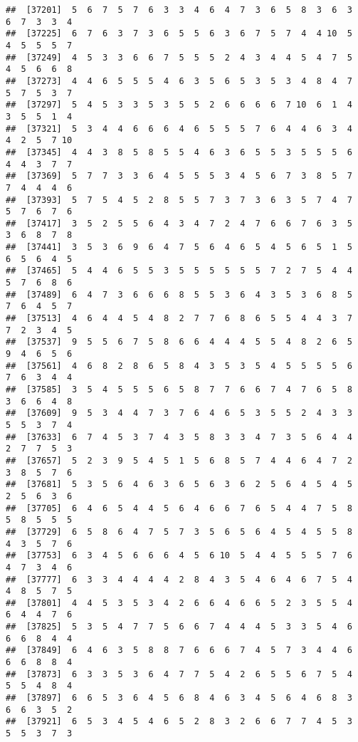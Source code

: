 \documentclass[
]{book}
\begin{document}
\begin{verbatim}
##  [37201]  5  6  7  5  7  6  3  3  4  6  4  7  3  6  5  8  3  6  3  6  7  3  3  4
##  [37225]  6  7  6  3  7  3  6  5  5  6  3  6  7  5  7  4  4 10  5  4  5  5  5  7
##  [37249]  4  5  3  3  6  6  7  5  5  5  2  4  3  4  4  5  4  7  5  4  5  6  6  8
##  [37273]  4  4  6  5  5  5  4  6  3  5  6  5  3  5  3  4  8  4  7  5  7  5  3  7
##  [37297]  5  4  5  3  3  5  3  5  5  2  6  6  6  6  7 10  6  1  4  3  5  5  1  4
##  [37321]  5  3  4  4  6  6  6  4  6  5  5  5  7  6  4  4  6  3  4  4  2  5  7 10
##  [37345]  4  4  3  8  5  8  5  5  4  6  3  6  5  5  3  5  5  5  6  4  4  3  7  7
##  [37369]  5  7  7  3  3  6  4  5  5  5  3  4  5  6  7  3  8  5  7  7  4  4  4  6
##  [37393]  5  7  5  4  5  2  8  5  5  7  3  7  3  6  3  5  7  4  7  5  7  6  7  6
##  [37417]  3  5  2  5  5  6  4  3  4  7  2  4  7  6  6  7  6  3  5  3  6  8  7  8
##  [37441]  3  5  3  6  9  6  4  7  5  6  4  6  5  4  5  6  5  1  5  6  5  6  4  5
##  [37465]  5  4  4  6  5  5  3  5  5  5  5  5  5  7  2  7  5  4  4  5  7  6  8  6
##  [37489]  6  4  7  3  6  6  6  8  5  5  3  6  4  3  5  3  6  8  5  7  6  4  5  7
##  [37513]  4  6  4  4  5  4  8  2  7  7  6  8  6  5  5  4  4  3  7  7  2  3  4  5
##  [37537]  9  5  5  6  7  5  8  6  6  4  4  4  5  5  4  8  2  6  5  9  4  6  5  6
##  [37561]  4  6  8  2  8  6  5  8  4  3  5  3  5  4  5  5  5  5  6  7  6  3  4  4
##  [37585]  3  5  4  5  5  5  6  5  8  7  7  6  6  7  4  7  6  5  8  3  6  6  4  8
##  [37609]  9  5  3  4  4  7  3  7  6  4  6  5  3  5  5  2  4  3  3  5  5  3  7  4
##  [37633]  6  7  4  5  3  7  4  3  5  8  3  3  4  7  3  5  6  4  4  2  7  7  5  3
##  [37657]  5  2  3  9  5  4  5  1  5  6  8  5  7  4  4  6  4  7  2  3  8  5  7  6
##  [37681]  5  3  5  6  4  6  3  6  5  6  3  6  2  5  6  4  5  4  5  2  5  6  3  6
##  [37705]  6  4  6  5  4  4  5  6  4  6  6  7  6  5  4  4  7  5  8  5  8  5  5  5
##  [37729]  6  5  8  6  4  7  5  7  3  5  6  5  6  4  5  4  5  5  8  4  3  5  7  6
##  [37753]  6  3  4  5  6  6  6  4  5  6 10  5  4  4  5  5  5  7  6  4  7  3  4  6
##  [37777]  6  3  3  4  4  4  4  2  8  4  3  5  4  6  4  6  7  5  4  4  8  5  7  5
##  [37801]  4  4  5  3  5  3  4  2  6  6  4  6  6  5  2  3  5  5  4  6  4  4  7  6
##  [37825]  5  3  5  4  7  7  5  6  6  7  4  4  4  5  3  3  5  4  6  6  6  8  4  4
##  [37849]  6  4  6  3  5  8  8  7  6  6  6  7  4  5  7  3  4  4  6  6  6  8  8  4
##  [37873]  6  3  3  5  3  6  4  7  7  5  4  2  6  5  5  6  7  5  4  5  5  4  8  4
##  [37897]  6  6  5  3  6  4  5  6  8  4  6  3  4  5  6  4  6  8  3  6  6  3  5  2
##  [37921]  6  5  3  4  5  4  6  5  2  8  3  2  6  6  7  7  4  5  3  5  5  3  7  3

\end{verbatim}
\end{document}
